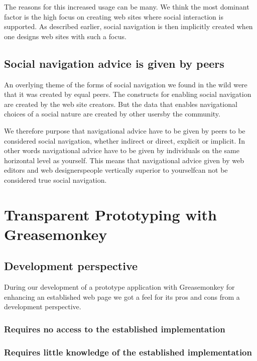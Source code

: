 The reasons for this increased usage can be many. We think the most dominant
factor is the high focus on creating web sites where social interaction is
supported. As described earlier, social navigation is then implicitly created
when one designs web sites with such a focus.

\subsection{Social navigation advice is given by peers}

An overlying theme of the forms of social navigation we found in the wild were
that it was created by equal peers. The constructs for enabling social
navigation are created by the web site creators. But the data that
enables navigational choices of a social nature are created by other
users\dash{}by the community.

We therefore purpose that navigational advice have to
be given by peers to be considered social navigation,
whether indirect or direct, explicit or implicit.
In other words
navigational advice have to be given by individuals on the same horizontal
level as yourself. This means that navigational advice given by web editors
and web designers\dash{}people vertically superior to yourself\dash{}can not
be considered true social navigation.

\section{Transparent Prototyping with Greasemonkey}

\subsection{Development perspective}

During our development of a prototype application with Greasemonkey for
enhancing an established web page we got a feel for its pros and cons from a
development perspective.

\subsubsection{Requires no access to the established implementation}

\subsubsection{Requires little knowledge of the established implementation}

